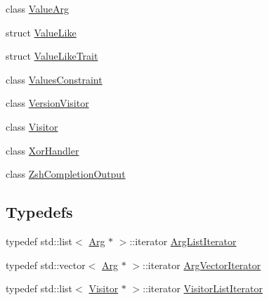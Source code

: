 \begin{DoxyCompactItemize}
class \hyperlink{class_t_c_l_a_p_1_1_value_arg}{Value\+Arg}
\item 
struct \hyperlink{struct_t_c_l_a_p_1_1_value_like}{Value\+Like}
\item 
struct \hyperlink{struct_t_c_l_a_p_1_1_value_like_trait}{Value\+Like\+Trait}
\item 
class \hyperlink{class_t_c_l_a_p_1_1_values_constraint}{Values\+Constraint}
\item 
class \hyperlink{class_t_c_l_a_p_1_1_version_visitor}{Version\+Visitor}
\item 
class \hyperlink{class_t_c_l_a_p_1_1_visitor}{Visitor}
\item 
class \hyperlink{class_t_c_l_a_p_1_1_xor_handler}{Xor\+Handler}
\item 
class \hyperlink{class_t_c_l_a_p_1_1_zsh_completion_output}{Zsh\+Completion\+Output}
\end{DoxyCompactItemize}
\subsection*{Typedefs}
\begin{DoxyCompactItemize}
\item 
typedef std\+::list$<$ \hyperlink{class_t_c_l_a_p_1_1_arg}{Arg} $\ast$ $>$\+::iterator \hyperlink{namespace_t_c_l_a_p_aa7d6a803e0690c3c8b1db57c145648c5}{Arg\+List\+Iterator}
\item 
typedef std\+::vector$<$ \hyperlink{class_t_c_l_a_p_1_1_arg}{Arg} $\ast$ $>$\+::iterator \hyperlink{namespace_t_c_l_a_p_a04213af1ffc3178ce5f771d21d5164a2}{Arg\+Vector\+Iterator}
\item 
typedef std\+::list$<$ \hyperlink{class_t_c_l_a_p_1_1_visitor}{Visitor} $\ast$ $>$\+::iterator \hyperlink{namespace_t_c_l_a_p_a30300bc675a64eacafa1298268de1101}{Visitor\+List\+Iterator}
\end{DoxyCompactItemize}
